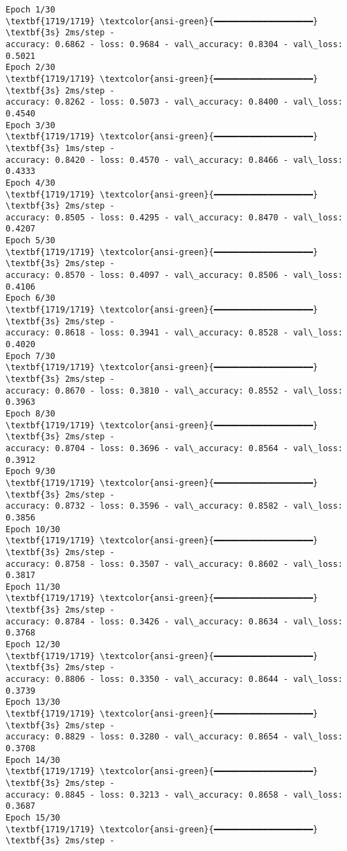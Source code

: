 \documentclass[12pt letter]{report}
\begin{document}
    \begin{Verbatim}[commandchars=\\\{\}]
Epoch 1/30
\textbf{1719/1719} \textcolor{ansi-green}{━━━━━━━━━━━━━━━━━━━━} \textbf{3s} 2ms/step -
accuracy: 0.6862 - loss: 0.9684 - val\_accuracy: 0.8304 - val\_loss: 0.5021
Epoch 2/30
\textbf{1719/1719} \textcolor{ansi-green}{━━━━━━━━━━━━━━━━━━━━} \textbf{3s} 2ms/step -
accuracy: 0.8262 - loss: 0.5073 - val\_accuracy: 0.8400 - val\_loss: 0.4540
Epoch 3/30
\textbf{1719/1719} \textcolor{ansi-green}{━━━━━━━━━━━━━━━━━━━━} \textbf{3s} 1ms/step -
accuracy: 0.8420 - loss: 0.4570 - val\_accuracy: 0.8466 - val\_loss: 0.4333
Epoch 4/30
\textbf{1719/1719} \textcolor{ansi-green}{━━━━━━━━━━━━━━━━━━━━} \textbf{3s} 2ms/step -
accuracy: 0.8505 - loss: 0.4295 - val\_accuracy: 0.8470 - val\_loss: 0.4207
Epoch 5/30
\textbf{1719/1719} \textcolor{ansi-green}{━━━━━━━━━━━━━━━━━━━━} \textbf{3s} 2ms/step -
accuracy: 0.8570 - loss: 0.4097 - val\_accuracy: 0.8506 - val\_loss: 0.4106
Epoch 6/30
\textbf{1719/1719} \textcolor{ansi-green}{━━━━━━━━━━━━━━━━━━━━} \textbf{3s} 2ms/step -
accuracy: 0.8618 - loss: 0.3941 - val\_accuracy: 0.8528 - val\_loss: 0.4020
Epoch 7/30
\textbf{1719/1719} \textcolor{ansi-green}{━━━━━━━━━━━━━━━━━━━━} \textbf{3s} 2ms/step -
accuracy: 0.8670 - loss: 0.3810 - val\_accuracy: 0.8552 - val\_loss: 0.3963
Epoch 8/30
\textbf{1719/1719} \textcolor{ansi-green}{━━━━━━━━━━━━━━━━━━━━} \textbf{3s} 2ms/step -
accuracy: 0.8704 - loss: 0.3696 - val\_accuracy: 0.8564 - val\_loss: 0.3912
Epoch 9/30
\textbf{1719/1719} \textcolor{ansi-green}{━━━━━━━━━━━━━━━━━━━━} \textbf{3s} 2ms/step -
accuracy: 0.8732 - loss: 0.3596 - val\_accuracy: 0.8582 - val\_loss: 0.3856
Epoch 10/30
\textbf{1719/1719} \textcolor{ansi-green}{━━━━━━━━━━━━━━━━━━━━} \textbf{3s} 2ms/step -
accuracy: 0.8758 - loss: 0.3507 - val\_accuracy: 0.8602 - val\_loss: 0.3817
Epoch 11/30
\textbf{1719/1719} \textcolor{ansi-green}{━━━━━━━━━━━━━━━━━━━━} \textbf{3s} 2ms/step -
accuracy: 0.8784 - loss: 0.3426 - val\_accuracy: 0.8634 - val\_loss: 0.3768
Epoch 12/30
\textbf{1719/1719} \textcolor{ansi-green}{━━━━━━━━━━━━━━━━━━━━} \textbf{3s} 2ms/step -
accuracy: 0.8806 - loss: 0.3350 - val\_accuracy: 0.8644 - val\_loss: 0.3739
Epoch 13/30
\textbf{1719/1719} \textcolor{ansi-green}{━━━━━━━━━━━━━━━━━━━━} \textbf{3s} 2ms/step -
accuracy: 0.8829 - loss: 0.3280 - val\_accuracy: 0.8654 - val\_loss: 0.3708
Epoch 14/30
\textbf{1719/1719} \textcolor{ansi-green}{━━━━━━━━━━━━━━━━━━━━} \textbf{3s} 2ms/step -
accuracy: 0.8845 - loss: 0.3213 - val\_accuracy: 0.8658 - val\_loss: 0.3687
Epoch 15/30
\textbf{1719/1719} \textcolor{ansi-green}{━━━━━━━━━━━━━━━━━━━━} \textbf{3s} 2ms/step -

\end{Verbatim}
\end{document}
